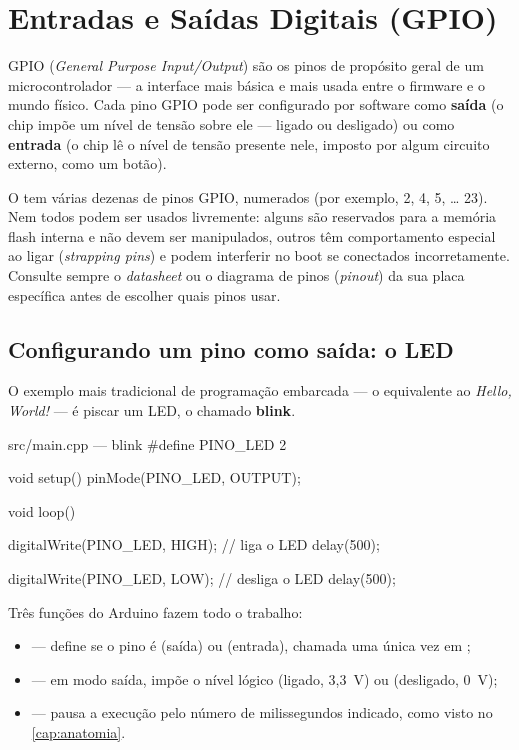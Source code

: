 \chapter{Entradas e Saídas Digitais (GPIO)}
\label{cap:gpio}

GPIO (\emph{General Purpose Input/Output}) são os pinos de propósito geral de um microcontrolador — a interface mais básica e mais usada entre o firmware e o mundo físico. Cada pino GPIO pode ser configurado por software como \textbf{saída} (o chip impõe um nível de tensão sobre ele — ligado ou desligado) ou como \textbf{entrada} (o chip lê o nível de tensão presente nele, imposto por algum circuito externo, como um botão).

\begin{esp32box}
O \ESP{} tem várias dezenas de pinos GPIO, numerados (por exemplo, 2, 4, 5, \ldots{} 23). Nem todos podem ser usados livremente: alguns são reservados para a memória flash interna e não devem ser manipulados, outros têm comportamento especial ao ligar (\emph{strapping pins}) e podem interferir no boot se conectados incorretamente. Consulte sempre o \emph{datasheet} ou o diagrama de pinos (\emph{pinout}) da sua placa específica antes de escolher quais pinos usar.
\end{esp32box}

\section{Configurando um pino como saída: o LED}

O exemplo mais tradicional de programação embarcada — o equivalente ao \emph{Hello, World!} — é piscar um LED, o chamado \textbf{blink}.

\begin{codigoc}{src/main.cpp — blink}
#define PINO_LED 2

void setup() {
    pinMode(PINO_LED, OUTPUT);
}

void loop() {
    digitalWrite(PINO_LED, HIGH);   // liga o LED
    delay(500);

    digitalWrite(PINO_LED, LOW);    // desliga o LED
    delay(500);
}
\end{codigoc}

Três funções do Arduino fazem todo o trabalho:

\begin{itemize}
    \item {} — define se o pino é  (saída) ou  (entrada), chamada uma única vez em ;
    \item {} — em modo saída, impõe o nível lógico  (ligado, 3,3~V) ou  (desligado, 0~V);
    \item {} — pausa a execução pelo número de milissegundos indicado, como visto no \cref{cap:anatomia}.
\end{itemize}

